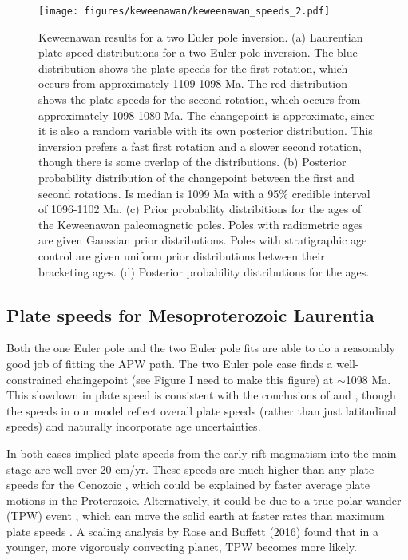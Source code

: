 \documentclass[preprint,12pt,authoryear]{elsarticle}
\begin{document}
\begin{figure}
\texttt{[image: figures/keweenawan/keweenawan\_speeds\_2.pdf]}
\caption[Keweenawan results for a two Euler pole inversion]{ Keweenawan results for a two Euler pole inversion.
(a) Laurentian plate speed distributions for a two-Euler pole inversion. The blue distribution shows the plate speeds for the first rotation, which occurs from approximately 1109-1098 Ma. The red distribution shows the plate speeds for the second rotation, which occurs from approximately 1098-1080 Ma. The changepoint is approximate, since it is also a random variable with its own posterior distribution. This inversion prefers a fast first rotation and a slower second rotation, though there is some overlap of the distributions.
(b) Posterior probability distribution of the changepoint between the first and second rotations. Is median is 1099 Ma with a 95\% credible interval of 1096-1102 Ma.
(c) Prior probability distribitions for the ages of the Keweenawan paleomagnetic poles. Poles with radiometric ages are given Gaussian prior distributions. Poles with stratigraphic age control are given uniform prior distributions between their bracketing ages. 
(d) Posterior probability distributions for the ages.}
\label{fig:keweenawan_speeds_2}
\end{figure}


\subsection{Plate speeds for Mesoproterozoic Laurentia}
\label{sec:laurentian_plate_speeds}
Both the one Euler pole and the two Euler pole fits are able to do a reasonably good job of fitting the APW path.
The two Euler pole case finds a well-constrained chaingepoint (see Figure I need to make this figure) at $\sim$1098 Ma.
This slowdown in plate speed is consistent with the conclusions of \citet{davis1997geochronology} 
and \citet{swanson2009no}, though the speeds in our model reflect overall plate speeds 
(rather than just latitudinal speeds) and naturally incorporate age uncertainties.

In both cases implied plate speeds from the early rift magmatism into the main stage are well over 20 cm/yr.
These speeds are much higher than any plate speeds for the Cenozoic \citep{zahirovic2015tectonic},
which could be explained by faster average plate motions in the Proterozoic.
Alternatively, it could be due to a true polar wander (TPW) event \citep{evans2003true, swanson2009no},
which can move the solid earth at faster rates than maximum plate speeds \citep{cambiotti2011new}.
A scaling analysis by Rose and Buffett (2016) found that in a younger, more vigorously convecting
planet, TPW becomes more likely.
\end{document}
